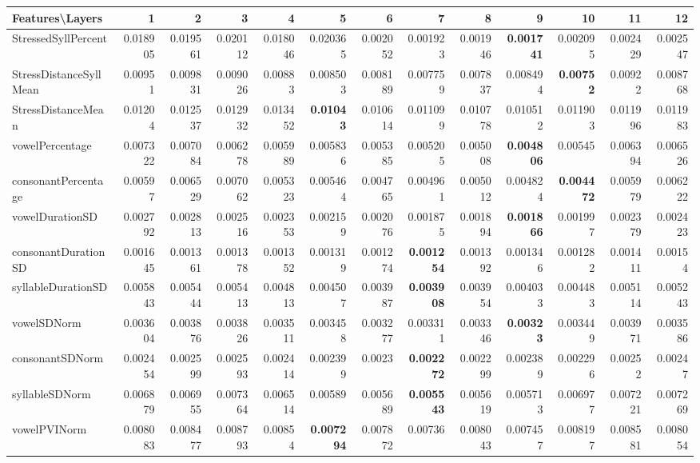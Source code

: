 \documentclass[sigconf]{acmart}
\begin{document}
\begin{table*}[!htb]
\begin{adjustbox}{width=1\textwidth}
\begin{tabular}{@{}l|rrrrrrrrrrrr@{}}
\toprule
\textbf{Features\textbackslash{}Layers} & 1 & 2 & 3 & 4 & 5 & 6 & 7 & 8 & 9 & 10 & 11 & 12 \\ \midrule
StressedSyllPercent & 0.018905 & 0.019561 & 0.020112 & 0.018046 & 0.020365 & 0.002052 & 0.001923 & 0.001946 & \textbf{0.001741} & 0.002095 & 0.002429 & 0.002547 \\
StressDistanceSyllMean & 0.00951 & 0.009831 & 0.009026 & 0.00883 & 0.008503 & 0.008189 & 0.007759 & 0.007837 & 0.008494 & \textbf{0.00752} & 0.00922 & 0.008768 \\
StressDistanceMean & 0.01204 & 0.012537 & 0.012932 & 0.013452 & \textbf{0.01043} & 0.010614 & 0.011099 & 0.010778 & 0.010512 & 0.011903 & 0.011996 & 0.011983 \\
vowelPercentage & 0.007322 & 0.007084 & 0.006278 & 0.005989 & 0.005836 & 0.005385 & 0.005205 & 0.005008 & \textbf{0.004806} & 0.00545 & 0.006394 & 0.006526 \\
consonantPercentage & 0.00597 & 0.006529 & 0.007062 & 0.005323 & 0.005464 & 0.004765 & 0.004961 & 0.005012 & 0.004824 & \textbf{0.004472} & 0.005979 & 0.006222 \\
vowelDurationSD & 0.002792 & 0.002813 & 0.002516 & 0.002353 & 0.002159 & 0.002076 & 0.001875 & 0.001894 & \textbf{0.001866} & 0.001997 & 0.002379 & 0.002423 \\
consonantDurationSD & 0.001645 & 0.001361 & 0.001378 & 0.001352 & 0.001319 & 0.001274 & \textbf{0.001254} & 0.001392 & 0.001346 & 0.001282 & 0.001411 & 0.00154 \\
syllableDurationSD & 0.005843 & 0.005444 & 0.005413 & 0.004813 & 0.004507 & 0.003987 & \textbf{0.003908} & 0.003954 & 0.004033 & 0.004483 & 0.005114 & 0.005243 \\
vowelSDNorm & 0.003604 & 0.003876 & 0.003826 & 0.003511 & 0.003458 & 0.003277 & 0.003311 & 0.003346 & \textbf{0.00323} & 0.003449 & 0.003971 & 0.003586 \\
consonantSDNorm & 0.002454 & 0.002599 & 0.002593 & 0.002414 & 0.002399 & 0.0023 & \textbf{0.002272} & 0.002299 & 0.002389 & 0.002296 & 0.00252 & 0.00247 \\
syllableSDNorm & 0.006879 & 0.006955 & 0.007364 & 0.006514 & 0.00589 & 0.005689 & \textbf{0.005543} & 0.005619 & 0.005713 & 0.006977 & 0.007221 & 0.007269 \\
vowelPVINorm & 0.008083 & 0.008477 & 0.008793 & 0.00854 & \textbf{0.007294} & 0.007872 & 0.00736 & 0.008043 & 0.007457 & 0.008197 & 0.008581 & 0.008054 \\

\end{tabular}
\end{adjustbox}
\end{table*}
\end{document}
